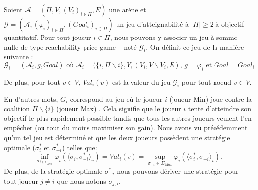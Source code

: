 \begin{defi}
	\label{defi:coalGame}
 Soient $\mathcal{A} = (\Pi, V, (V_{i})_{i\in\Pi}, E)$ une arène et $\mathcal{G} = (\mathcal{A}, (\varphi _{i})_{i\in\Pi}, (Goal_{i})_{i\in\Pi})$ un jeu d'atteignabilité à $|\Pi| \geq 2$ à objectif quantitatif.
Pour tout joueur $i \in \Pi$, nous pouvons y associer un jeu à somme nulle de type \og reachability-price game \fg~ noté $\mathcal{G}_{i}$.
On définit ce jeu de la manière suivante : 
$$ \displaystyle \mathcal{G}_{i}= (\mathcal{A}_{i}, g , Goal) \text{ où } \mathcal{A}_{i} = (\{i,\Pi\backslash{i}\}, V, (V_{i},V\backslash V_i,E) \text{, } g = \varphi_i \text{ et } Goal = Goal_i$$

\noindent De plus, pour tout $v\in V$, $Val_i(v)$ est la valeur du jeu $\mathcal{G}_i$ pour tout noeud $v\in V$. 
\end{defi} 

En d'autres mots, $G_i$ correspond au jeu où le joueur $i$ (joueur Min) joue contre la coalition $\Pi\backslash\{ i \}$ (joueur Max) . Cela signifie que le joueur $i$ tente d'atteindre son objectif le plus rapidement possible tandis que tous les autres joueurs veulent l'en empêcher (ou tout du moins maximiser son gain). Nous avons vu précédemment qu'un tel jeu est déterminé et que les deux joueurs possèdent une stratégie optimale ($\sigma^*_i$ et $\sigma^*_{-i}$) telles que:
$$ \inf_{\sigma _{i\in \Sigma _{Min}}} \varphi_i(\langle \sigma_i,\sigma^*_{-i}\rangle_v)= Val_i(v) = \sup _{\sigma_{-i}\in \Sigma_{Max}} \varphi_i(\langle \sigma^*_i, \sigma_{-i}\rangle_v).$$ De plus, de la stratégie optimale $\sigma^*_{-i}$ nous pouvons dériver une stratégie pour tout joueur $j \neq i$ que nous notons $\sigma_{j,i}$.\\

